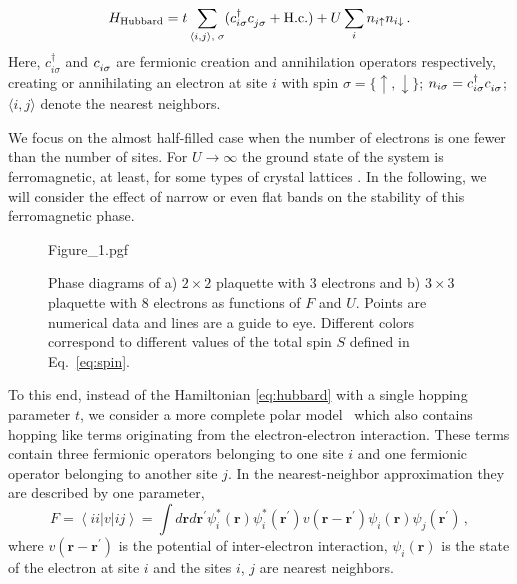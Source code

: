 \begin{equation}\label{eq:hubbard}
    H_\text{Hubbard} = t \sum_{\substack{\langle i,j\rangle, \;\sigma}} (c^\dagger_{i\sigma} c^{\vphantom{\dagger}}_{j\sigma} + \text{H.c.})
      + U \sum_{i} n_{i\uparrow}n_{i\downarrow} \,.
\end{equation}
Here, $c^\dagger_{i\sigma}$ and $c^{\vphantom{\dagger}}_{i\sigma}$ are fermionic creation and annihilation operators respectively, creating or annihilating an electron at site $i$ with spin $\sigma = \{ \uparrow, \downarrow \}$; $n_{i\sigma} = c^\dagger_{i\sigma} c^{\vphantom{\dagger}}_{i\sigma}$; $\langle i, j \rangle$ denote the nearest neighbors.

We focus on the almost half-filled case when the number of electrons is one fewer than the number of sites. For $U\to \infty$ the ground state of the system is ferromagnetic, at least, for some types of crystal lattices \cite{nagaoka1966ferromagnetism}. In the following, we will consider the effect of narrow or even flat bands on the stability of this ferromagnetic phase. 

\begin{figure}[t]
    \centering
    {Figure_1.pgf}
    \caption{Phase diagrams of a) $2\times 2$ plaquette with 3 electrons and b) $3\times 3$ plaquette with 8 electrons as functions of $F$ and $U$. Points are numerical data and lines are a guide to eye. Different colors correspond to different values of the total spin $S$ defined in Eq.~\eqref{eq:spin}.}
    \label{fig:ferromagnetism}
\end{figure}

To this end, instead of the Hamiltonian \eqref{eq:hubbard} with a single hopping parameter $t$, we consider a more complete polar model~\cite{schubin1934electron,vonsovsky1979some1,vonsovsky1979some2} which also contains hopping like terms originating from the electron-electron interaction. These terms contain three fermionic operators belonging to one site $i$ and one fermionic operator belonging to another site $j$. In the nearest-neighbor approximation they are described by one parameter,
\begin{equation}\label{eq:coulomb}
    F \!= \left\langle ii\left| v\right| ij\right\rangle \!= \!\!\int d{\mathbf{r}}d{\mathbf{r}}%
^{\prime }\psi _{i}^{\ast }({\mathbf{r}})\psi _{i}^{\ast }({\mathbf{r}}^{\prime
})v\left( {\mathbf{r-r}}^{\prime }\right) \psi _{i}({\mathbf{r}})\psi _{j}({\mathbf{r}}%
^{\prime }) \,,
\end{equation}
where $v\left( {\mathbf{r-r}}^{\prime }\right)$ is the potential of inter-electron interaction, $\psi _{i}({\mathbf{r}})$ is the state of the electron at site $i$ and the sites $i$, $j$ are nearest neighbors. 


